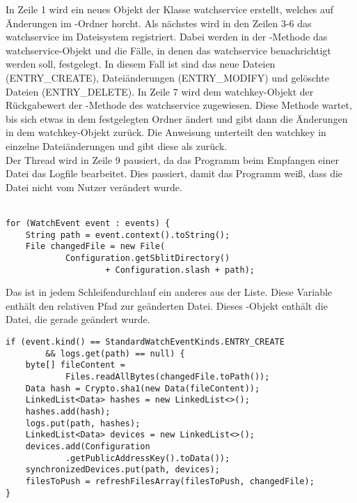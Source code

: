 In Zeile 1 wird ein neues Objekt der Klasse \gls{watchservice} erstellt, welches auf Änderungen im \sblit-Ordner horcht. Als nächstes wird in den Zeilen 3-6 das \gls{watchservice} im Dateisystem registriert. Dabei werden in der -Methode das \gls{watchservice}-Objekt und die Fälle, in denen das \gls{watchservice} benachrichtigt werden soll, festgelegt. In diesem Fall ist sind das neue Dateien (ENTRY\_CREATE), Dateiänderungen (ENTRY\_MODIFY) und gelöschte Dateien (ENTRY\_DELETE). In Zeile 7 wird dem \gls{watchkey}-Objekt der Rückgabewert der -Methode des \gls{watchservice} zugewiesen. Diese Methode wartet, bis sich etwas in dem festgelegten Ordner ändert und gibt dann die Änderungen in dem \gls{watchkey}-Objekt zurück. Die Anweisung  unterteilt den \gls{watchkey} in einzelne Dateiänderungen und gibt diese als  zurück. \\ 
Der Thread wird in Zeile 9 pausiert, da das Programm beim Empfangen einer Datei das Logfile bearbeitet. Dies passiert, damit das Programm weiß, dass die Datei nicht vom Nutzer verändert wurde. \\ \\
\javalisting
\begin{minipage}{\linewidth}
\begin{lstlisting}[caption={Unterteilen in einzelne Dateien},captionpos=b]
for (WatchEvent event : events) {
	String path = event.context().toString();
	File changedFile = new File(
			Configuration.getSblitDirectory()
					+ Configuration.slash + path);
\end{lstlisting}
\end{minipage}
\begin{description}
	Das  ist in jedem Schleifendurchlauf ein anderes aus der Liste. 
	Diese Variable enthält den relativen Pfad zur geänderten Datei.
	Dieses -Objekt enthält die Datei, die gerade geändert wurde.
\end{description}
\javalisting
\begin{minipage}{\linewidth}
\begin{lstlisting}[caption={Erstellen einer Datei},captionpos=b]
if (event.kind() == StandardWatchEventKinds.ENTRY_CREATE 
		&& logs.get(path) == null) {
	byte[] fileContent = 
			Files.readAllBytes(changedFile.toPath());
	Data hash = Crypto.sha1(new Data(fileContent));
	LinkedList<Data> hashes = new LinkedList<>();
	hashes.add(hash);
	logs.put(path, hashes);
	LinkedList<Data> devices = new LinkedList<>();
	devices.add(Configuration
			.getPublicAddressKey().toData());
	synchronizedDevices.put(path, devices);
	filesToPush = refreshFilesArray(filesToPush, changedFile);
}
\end{lstlisting}
\end{minipage}	

